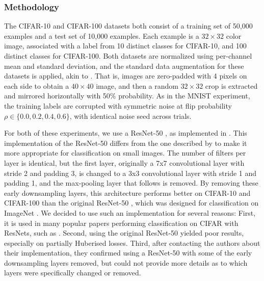 \subsubsection{Methodology}

The CIFAR-10 and CIFAR-100 datasets \parencite{krizhevsky_learning_2009} both consist of a training set of 50,000 examples and a test set of 10,000 examples. Each example is a $32 \times 32$ color image, associated with a label from 10 distinct classes for CIFAR-10, and 100 distinct classes for CIFAR-100. Both datasets are normalized using per-channel mean and standard deviation, and the standard data augmentation for these datasets is applied, akin to  \textcite{zagoruyko_wide_2016}. That is, images are zero-padded with 4 pixels on each side to obtain a $40 \times 40$ image, and then a random $32 \times 32$ crop is extracted and mirrored horizontally with 50\% probability. As in the MNIST experiment, the training labels are corrupted with symmetric noise at flip probability $\rho \in \{0.0,0.2,0.4,0.6\}$, with identical noise seed across trials.

For both of these experiments, we use a ResNet-50 \parencite{he_deep_2015}, as implemented in \textcite{liu_kuangliupytorch-cifar_2017}. This implementation of the ResNet-50 differs from the one described by \textcite{he_deep_2015} to make it more appropriate for classification on small images. The number of filters per layer is identical, but the first layer, originally a 7x7 convolutional layer with stride 2 and padding 3, is changed to a 3x3 convolutional layer with stride 1 and padding 1, and the max-pooling layer that follows is removed. By removing these early downsampling layers, this architecture performs better on CIFAR-10 and CIFAR-100 than the original ResNet-50 \footnotemark, which was designed for classification on ImageNet  \parencite{imagenet_cvpr09}. We decided to use such an implementation for several reasons: First, it is used in many popular papers performing classification on CIFAR with ResNets, such as \textcite{devries_improved_2017, zhang_mixup_2018, li_dividemix_2020, zhang_lookahead_2019}. Second, using the original ResNet-50 yielded poor results, especially on partially Huberised losses. Third, after contacting the authors about their implementation, they confirmed using a ResNet-50 with some of the early downsampling layers removed, but could not provide more details as to which layers were specifically changed or removed. 


